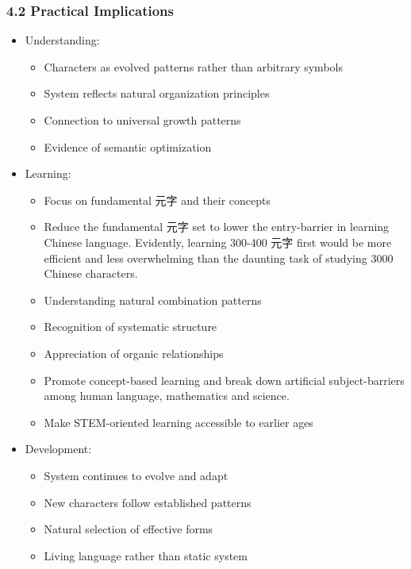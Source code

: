\documentclass[
]{article}
\providecommand{\tightlist}{%
  \setlength{\itemsep}{0pt}\setlength{\parskip}{0pt}}
\begin{document}
\subsubsection{4.2 Practical Implications}\label{practical-implications}

\begin{itemize}
\tightlist
\item
  Understanding:

  \begin{itemize}
  \tightlist
  \item
    Characters as evolved patterns rather than arbitrary symbols
  \item
    System reflects natural organization principles
  \item
    Connection to universal growth patterns
  \item
    Evidence of semantic optimization
  \end{itemize}
\item
  Learning:

  \begin{itemize}
  \tightlist
  \item
    Focus on fundamental 元字 and their concepts
  \item
    Reduce the fundamental 元字 set to lower the entry-barrier in
    learning Chinese language. Evidently, learning 300-400 元字 first
    would be more efficient and less overwhelming than the daunting task
    of studying 3000 Chinese characters.
  \item
    Understanding natural combination patterns
  \item
    Recognition of systematic structure
  \item
    Appreciation of organic relationships
  \item
    Promote concept-based learning and break down artificial
    subject-barriers among human language, mathematics and science.
  \item
    Make STEM-oriented learning accessible to earlier ages
  \end{itemize}
\item
  Development:

  \begin{itemize}
  \tightlist
  \item
    System continues to evolve and adapt
  \item
    New characters follow established patterns
  \item
    Natural selection of effective forms
  \item
    Living language rather than static system
  \end{itemize}
\end{itemize}
\end{document}
